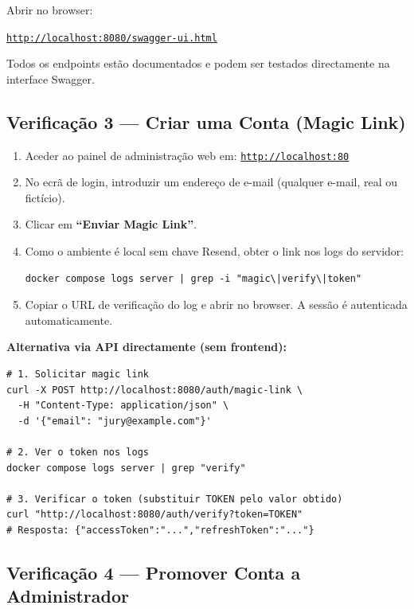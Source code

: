 \documentclass[12pt,a4paper]{article}
\begin{document}
Abrir no browser:

\begin{mdframed}[style=infobox]
\centering
\href{http://localhost:8080/swagger-ui.html}{\large\texttt{http://localhost:8080/swagger-ui.html}}
\end{mdframed}

Todos os endpoints estão documentados e podem ser testados directamente na interface Swagger.

\subsection{Verificação 3 — Criar uma Conta (Magic Link)}

\begin{enumerate}
  \item Aceder ao painel de administração web em: \href{http://localhost:80}{\texttt{http://localhost:80}}
  \item No ecrã de login, introduzir um endereço de e-mail (qualquer e-mail, real ou fictício).
  \item Clicar em \textbf{``Enviar Magic Link''}.
  \item Como o ambiente é local sem chave Resend, obter o link nos logs do servidor:
  \begin{lstlisting}[style=bash]
  docker compose logs server | grep -i "magic\|verify\|token"
  \end{lstlisting}
  \item Copiar o URL de verificação do log e abrir no browser. A sessão é autenticada automaticamente.
\end{enumerate}

\begin{mdframed}[style=warningbox]
\textbf{Alternativa via API directamente (sem frontend):}
\begin{lstlisting}[style=bash]
# 1. Solicitar magic link
curl -X POST http://localhost:8080/auth/magic-link \
  -H "Content-Type: application/json" \
  -d '{"email": "jury@example.com"}'

# 2. Ver o token nos logs
docker compose logs server | grep "verify"

# 3. Verificar o token (substituir TOKEN pelo valor obtido)
curl "http://localhost:8080/auth/verify?token=TOKEN"
# Resposta: {"accessToken":"...","refreshToken":"..."}
\end{lstlisting}
\end{mdframed}

\subsection{Verificação 4 — Promover Conta a Administrador}
\label{sec:promote}
\end{document}
